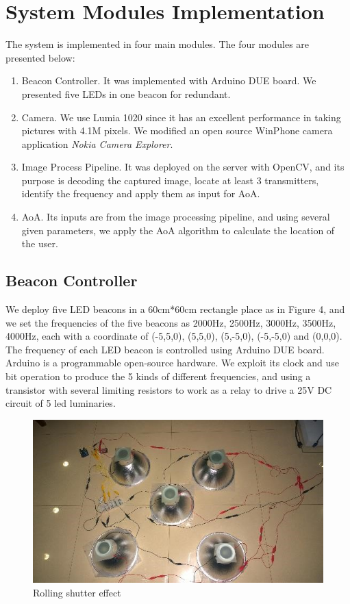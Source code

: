 \documentclass[a4paper, 11pt]{article} %
\begin{document}
\section{System Modules Implementation}
The system is implemented in four main modules. The four modules are presented below:
\begin{enumerate}
	\item Beacon Controller. It was implemented with Arduino DUE board. We presented five LEDs in one beacon for redundant.
	\item Camera. We use Lumia 1020 since it has an excellent performance in taking pictures with 4.1M pixels. We modified an open source WinPhone camera application \textit{Nokia Camera Explorer\cite{NCE}}. 
	\item Image Process Pipeline. It was deployed on the server with OpenCV, and its purpose is decoding the captured image, locate at least 3 transmitters, identify the frequency and apply them as input for AoA.
	\item AoA. Its inputs are from the image processing pipeline, and using several given parameters, we apply the AoA algorithm to calculate the location of the user.
\end{enumerate}

\subsection{Beacon Controller}
We deploy five LED beacons in a 60cm*60cm rectangle place as in Figure 4, and we set the frequencies of the five beacons as 2000Hz, 2500Hz, 3000Hz, 3500Hz, 4000Hz, each with a coordinate of (-5,5,0), (5,5,0), (5,-5,0), (-5,-5,0) and (0,0,0). 
The frequency of each LED beacon is controlled using Arduino DUE board. Arduino is a programmable open-source hardware. We exploit its clock and use bit operation to produce the 5 kinds of different frequencies, and using a transistor with several limiting resistors to work as a relay to drive a 25V DC circuit of 5 led luminaries.
\begin{figure}[h]
	\centering 
	\includegraphics[width=0.8\linewidth]{Figure3.jpg}
	\caption{Rolling shutter effect}
	\label{fig:subfig}
\end{figure}
\end{document}

